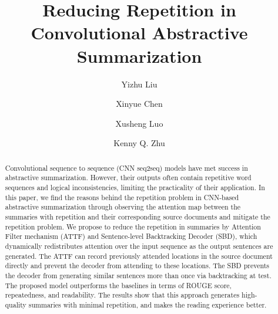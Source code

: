 \documentclass{nle}
\theoremstyle{definition}
\begin{document}
\label{firstpage}




\title{Reducing Repetition in Convolutional Abstractive Summarization}

\begin{authgrp}
\author{Yizhu Liu}
\author{Xinyue Chen}
\author{Xusheng Luo}
\author{ Kenny Q. Zhu}
\end{authgrp}


\begin{abstract}
Convolutional sequence to sequence (CNN seq2seq) models have met success in abstractive summarization. However, their outputs often contain repetitive word sequences and logical inconsistencies,
limiting the practicality of their application. 
In this paper, we find the reasons behind the repetition problem in CNN-based abstractive summarization through observing the attention map between the summaries with repetition and their corresponding source documents and mitigate the repetition problem.
We propose to reduce the repetition in summaries by 
Attention Filter mechanism (ATTF) and Sentence-level Backtracking Decoder (SBD),
which dynamically redistributes attention over the input sequence 
as the output sentences are generated. 
The ATTF can record previously attended locations in the source document directly and prevent the decoder from attending to these locations. The SBD prevents the decoder from generating similar sentences more than once via backtracking at test.
The proposed model outperforms the baselines 
in terms of ROUGE score, repeatedness, and readability. 
The results show that this approach 
generates high-quality summaries with minimal repetition,
and makes the reading experience better.
\end{abstract}
\end{document}

